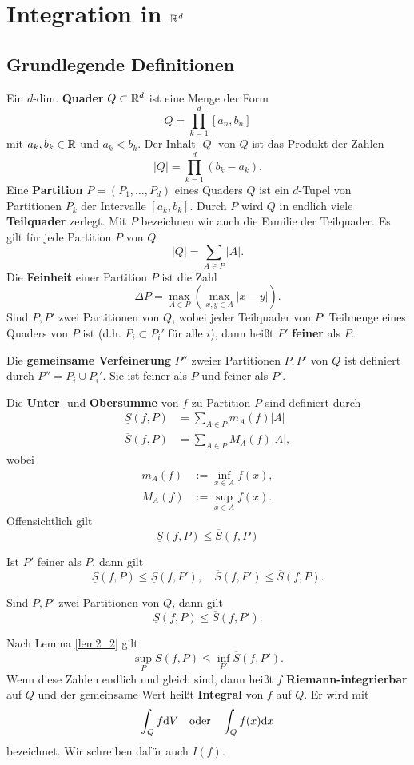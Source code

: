 \section{Integration in $\mathbb{R}^d$}
\subsection{Grundlegende Definitionen}
Ein $d$-dim. \textbf{Quader} $Q \subset \mathbb{R}^d$ ist eine Menge der Form
\[Q= \prod_{k=1}^d [a_n, b_n]\]
mit $a_k, b_k \in \mathbb{R}$ und $a_k < b_k$. Der Inhalt $|Q|$ von $Q$ ist das Produkt der Zahlen
\[|Q| = \prod_{k=1}^{d} (b_k - a_k).\]
Eine \textbf{Partition} $P = (P_1, \dots, P_d)$ eines Quaders $Q$ ist ein $d$-Tupel von Partitionen $P_k$ der Intervalle $[a_k, b_k]$. Durch $P$ wird $Q$ in endlich viele \textbf{Teilquader} zerlegt. Mit $P$ bezeichnen wir auch die Familie der Teilquader. Es gilt für jede Partition $P$ von $Q$
\[|Q| = \sum_{A\in P} |A|.\]
Die \textbf{Feinheit} einer Partition $P$ ist die Zahl
\[\Delta P = \max_{A \in P} \left(\max_{x,y \in A} |x-y|\right).\]
Sind $P, P'$ zwei Partitionen von $Q$, wobei jeder Teilquader von $P'$ Teilmenge eines Quaders von $P$ ist (d.h. $P_i \subset P_i'$ für alle $i$), dann heißt $P'$ \textbf{feiner} als $P$.

Die \textbf{gemeinsame Verfeinerung} $P''$ zweier Partitionen $P, P'$ von $Q$ ist definiert durch $P''=P_i \cup P_i'$. Sie ist feiner als $P$ und feiner als $P'$.

Die \textbf{Unter}- und \textbf{Obersumme} von $f$ zu Partition $P$ sind definiert durch
\begin{align*}
	\underline{S}(f, P) &= \sum_{A\in P} m_A(f) |A|\\
	\overline{S}(f,P) &= \sum_{A\in P} M_A (f) |A|,
\end{align*}
wobei
\begin{align*}
	m_A(f) &:= \inf_{x \in A} f(x),\\
	M_A(f) &:= \sup_{x \in A} f(x).
\end{align*}
Offensichtlich gilt 
\[\underline{S}(f,P) \leq \overline{S}(f,P)\]
\begin{lem}\label{lem2_1}
	Ist $P'$ feiner als $P$, dann gilt
	\[\underline{S}(f,P) \leq \underline{S}(f,P'),\quad \overline{S}(f,P') \leq \overline{S}(f,P).\]
\end{lem}
\begin{lem}\label{lem2_2}
	Sind $P,P'$ zwei Partitionen von $Q$, dann gilt 
	\[\underline{S}(f,P) \leq \overline{S}(f,P').\]
\end{lem}
Nach Lemma \ref{lem2_2} gilt 
\[\sup_P \underline{S}(f,P) \leq \inf_{P'} \overline{S}(f,P').\]
Wenn diese Zahlen endlich und gleich sind, dann heißt $f$ \textbf{Riemann-integrierbar} auf $Q$ und der gemeinsame Wert heißt \textbf{Integral} von $f$ auf $Q$. Er wird mit
\[\int_Q f\mathrm{d} V \quad\text{oder}\quad \int_Q f(x) \mathrm{d} x\]
bezeichnet. Wir schreiben dafür auch $I(f)$. 

